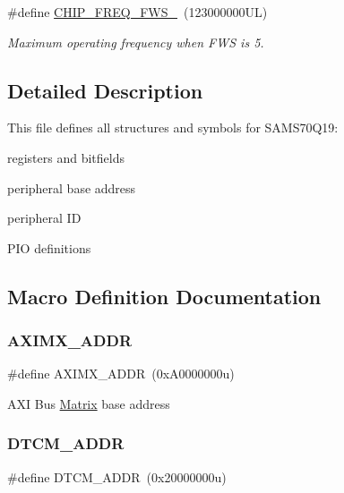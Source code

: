 \begin{DoxyCompactItemize}
\mbox{\label{group__SAMS70Q19__definitions_ga3b66824f858591135877b369f98d48a5}} 
\#define \mbox{\hyperlink{group__SAMS70Q19__definitions_ga3b66824f858591135877b369f98d48a5}{C\+H\+I\+P\+\_\+\+F\+R\+E\+Q\+\_\+\+F\+W\+S\+\_}}~(123000000\+U\+L)
\begin{DoxyCompactList}\small\item\em Maximum operating frequency when F\+WS is 5. \end{DoxyCompactList}\end{DoxyCompactItemize}


\subsection{Detailed Description}
This file defines all structures and symbols for S\+A\+M\+S70\+Q19\+:
\begin{DoxyItemize}
\item registers and bitfields
\item peripheral base address
\item peripheral ID
\item P\+IO definitions 
\end{DoxyItemize}

\subsection{Macro Definition Documentation}
\mbox{\label{group__SAMS70Q19__definitions_ga2fb7cc681bf5e7fbce5e3635b72a330a}} 
\subsubsection{\texorpdfstring{AXIMX\_ADDR}{AXIMX\_ADDR}}
{\footnotesize\ttfamily \#define A\+X\+I\+M\+X\+\_\+\+A\+D\+DR~(0x\+A0000000u)}

A\+XI Bus \mbox{\hyperlink{structMatrix}{Matrix}} base address \mbox{\label{group__SAMS70Q19__definitions_ga26626a425f7ebb3a0c2dbc276f0d9f78}} 
\subsubsection{\texorpdfstring{DTCM\_ADDR}{DTCM\_ADDR}}
{\footnotesize\ttfamily \#define D\+T\+C\+M\+\_\+\+A\+D\+DR~(0x20000000u)}

